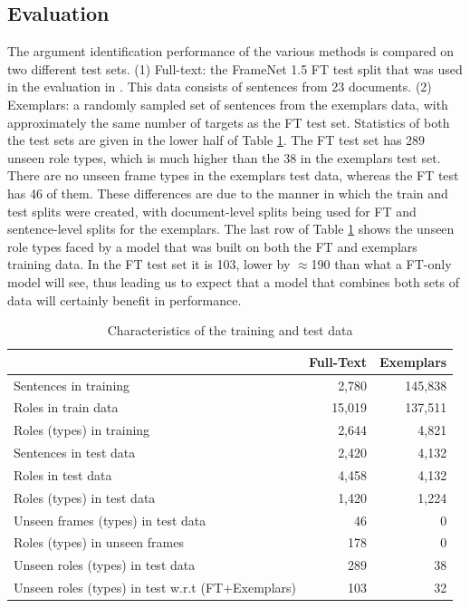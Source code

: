 \documentclass[11pt,a4paper]{article}
\begin{document}
\subsection{Evaluation}
The argument identification performance of the various methods is compared on two different test sets.
(1) Full-text: the FrameNet 1.5 FT test split that was used in the evaluation in \cite{das:2012}. This data consists of sentences from 23 documents. 
(2) Exemplars: a randomly sampled set of sentences from the exemplars data, with approximately the same number of targets as the FT test set.
Statistics of both the test sets are given in the lower half of Table \ref{tbl:datastats}. 
The FT test set has 289 unseen role types, which is much higher than
the 38 in the exemplars test set. There are no unseen frame types in the exemplars test data, whereas the FT test has 46 of them. 
These differences are due to the manner in which the train and test splits were created, with document-level splits being used
for FT and sentence-level splits for the exemplars.
The last row of Table \ref{tbl:datastats} shows the unseen role types faced by a model that was built on both the FT and exemplars training data.
In the FT test set it is 103, lower by $\approx$190 than what a FT-only model will see, thus leading us to expect that a model that combines
both sets of data will certainly benefit in performance.


\begin{table}\centering\small
\begin{tabular}{p{4cm}rr}
\toprule
\normalfont & \textbf{Full-Text} & \textbf{Exemplars} \\
\midrule
Sentences in training & 2,780 & 145,838 \\
Roles in train data & 15,019 & 137,511 \\
Roles (types) in training & 2,644 & 4,821 \\
Sentences in test data & 2,420 & 4,132 \\
Roles in test data & 4,458 & 4,132 \\
Roles (types) in test data & 1,420 & 1,224 \\
Unseen frames (types) in test data & 46 & 0 \\
Roles (types) in unseen frames & 178 & 0 \\
Unseen roles (types) in test data & 289 & 38 \\
Unseen roles (types) in test w.r.t (FT+Exemplars) & 103 & 32 \\
\end{tabular}
\caption{Characteristics of the training and test data}
\label{tbl:datastats}
\end{table}
\end{document}
